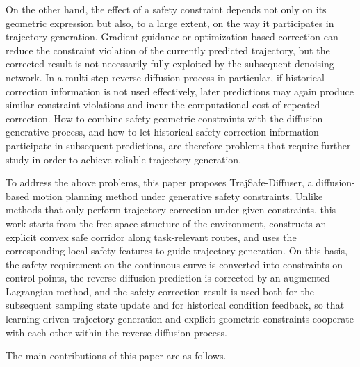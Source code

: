 \documentclass[journal]{IEEEtran}
\begin{document}
On the other hand, the effect of a safety constraint depends not only on its geometric expression but also, to a large extent, on the way it participates in trajectory generation. Gradient guidance or optimization-based correction can reduce the constraint violation of the currently predicted trajectory, but the corrected result is not necessarily fully exploited by the subsequent denoising network. In a multi-step reverse diffusion process in particular, if historical correction information is not used effectively, later predictions may again produce similar constraint violations and incur the computational cost of repeated correction. How to combine safety geometric constraints with the diffusion generative process, and how to let historical safety correction information participate in subsequent predictions, are therefore problems that require further study in order to achieve reliable trajectory generation.

To address the above problems, this paper proposes TrajSafe-Diffuser, a diffusion-based motion planning method under generative safety constraints. Unlike methods that only perform trajectory correction under given constraints, this work starts from the free-space structure of the environment, constructs an explicit convex safe corridor along task-relevant routes, and uses the corresponding local safety features to guide trajectory generation. On this basis, the safety requirement on the continuous curve is converted into constraints on control points, the reverse diffusion prediction is corrected by an augmented Lagrangian method, and the safety correction result is used both for the subsequent sampling state update and for historical condition feedback, so that learning-driven trajectory generation and explicit geometric constraints cooperate with each other within the reverse diffusion process.

The main contributions of this paper are as follows.
\end{document}
